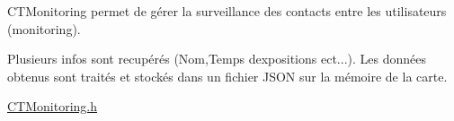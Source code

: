 CTMonitoring permet de gérer la surveillance des contacts entre les utilisateurs (monitoring).

Plusieurs infos sont recupérés (Nom,Temps d\textquotesingle{}expositions ect...). Les données obtenus sont traités et stockés dans un fichier JSON sur la mémoire de la carte.

\mbox{\hyperlink{_c_t_monitoring_8h}{CTMonitoring.\+h}} 